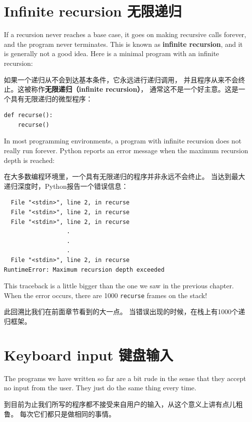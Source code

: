 \documentclass[10pt]{book}
\begin{document}
\begin{CJK}{UTF8}{gbsn}
\section{Infinite recursion 无限递归}

If a recursion never reaches a base case, it goes on making
recursive calls forever, and the program never terminates.  This is
known as {\bf infinite recursion}, and it is generally not
a good idea.  Here is a minimal program with an infinite recursion:

如果一个递归从不会到达基本条件，它永远进行递归调用，
并且程序从来不会终止。这被称作{\bf 无限递归（infinite recursion）}，
通常这不是一个好主意。这是一个具有无限递归的微型程序：

\begin{verbatim}
def recurse():
    recurse()
\end{verbatim}
%
In most programming environments, a program with infinite recursion
does not really run forever.  Python reports an error
message when the maximum recursion depth is reached:

在大多数编程环境里，一个具有无限递归的程序并非永远不会终止。
当达到最大递归深度时，Python报告一个错误信息：

\begin{verbatim}
  File "<stdin>", line 2, in recurse
  File "<stdin>", line 2, in recurse
  File "<stdin>", line 2, in recurse
                  .   
                  .
                  .
  File "<stdin>", line 2, in recurse
RuntimeError: Maximum recursion depth exceeded
\end{verbatim}
%
This traceback is a little bigger than the one we saw in the
previous chapter.  When the error occurs, there are 1000
{\tt recurse} frames on the stack!

此回溯比我们在前面章节看到的大一点。
当错误出现的时候，在栈上有1000个递归框架。

\section{Keyboard input 键盘输入}

The programs we have written so far are a bit rude in the sense that
they accept no input from the user.  They just do the same thing every
time.

到目前为止我们所写的程序都不接受来自用户的输入，从这个意义上讲有点儿粗鲁。
每次它们都只是做相同的事情。


\end{CJK}
\end{document}
